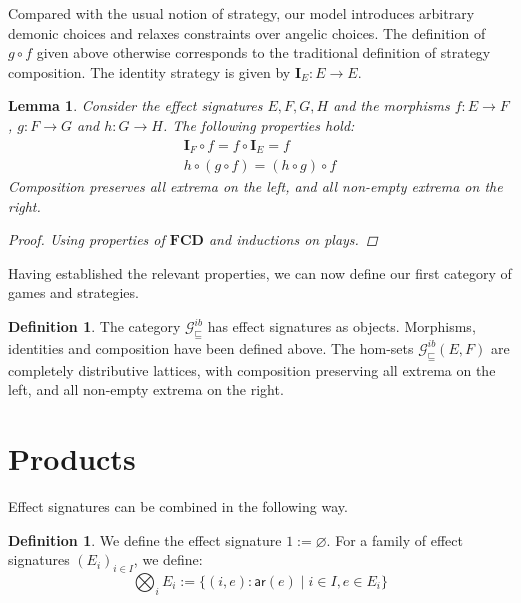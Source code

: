 \documentclass[draft,11pt]{report}
\newtheorem{lemma}[theorem]{Lemma}
\theoremstyle{definition}
\newtheorem{definition}[theorem]{Definition}
\newcommand{\gcat}{\mathcal{G}_{\sqsubseteq}}
\newcommand{\kw}[1]{\ensuremath{ \mathsf{#1} }}
\begin{document}
Compared with the usual notion of strategy,
our model introduces arbitrary demonic choices and
relaxes constraints over angelic choices.
The definition of $g \circ f$ given above
otherwise corresponds to the traditional
definition of strategy composition.
The identity strategy is given by $\mathbf{I}_E : E \rightarrow E$.

\begin{lemma}
Consider the effect signatures $E, F, G, H$ and
the morphisms
$f : E \rightarrow F$,
$g : F \rightarrow G$ and
$h : G \rightarrow H$.
The following properties hold:
\begin{gather*}
  \mathbf{I}_F \circ f = f \circ \mathbf{I}_E = f \\
  h \circ (g \circ f) = (h \circ g) \circ f
\end{gather*}
Composition preserves all extrema on the left,
and all non-empty extrema on the right.
\begin{proof}
Using properties of $\mathbf{FCD}$
and inductions on plays.
\end{proof}
\end{lemma}

Having established the relevant properties,
we can now define our first category of games and strategies.

\begin{definition}
The category $\gcat^{ib}$ has effect signatures as objects.
Morphisms, identities and composition have been defined above.
The hom-sets $\gcat^{ib}(E, F)$
are completely distributive lattices,
with composition preserving all extrema on the left,
and all non-empty extrema on the right.
\end{definition}


\section{Products} %

Effect signatures can be combined in the following way.

\begin{definition}
We define the effect signature
$1 := \varnothing$.
For a family of effect signatures $(E_i)_{i \in I}$,
we define:
\[
  \bigotimes_i E_i := \{ (i, e) : \kw{ar}(e) \mid i \in I, e \in E_i \}
\]
\end{definition}
\end{document}
